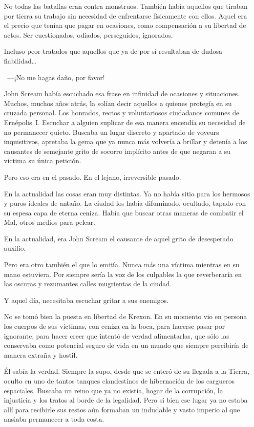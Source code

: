 No todas las batallas eran contra monstruos. También había aquellos que tiraban por tierra su trabajo sin necesidad de enfrentarse físicamente con ellos. Aquel era el precio que tenían que pagar en ocasiones, como compensación a su libertad de actos. Ser cuestionados, odiados, perseguidos, ignorados.

Incluso peor tratados que aquellos que ya de por sí resultaban de dudosa fiabilidad\dots

\fancyparbreak
~---¡No me hagas daño, por favor!

John Scream había escuchado esa frase en infinidad de ocasiones y situaciones. Muchos, muchos años atrás, la solían decir aquellos a quienes protegía en su cruzada personal. Los honrados, rectos y voluntariosos ciudadanos comunes de Ernépolis~I. Escuchar a alguien suplicar de esa manera encendía su necesidad de no permanecer quieto. Buscaba un lugar discreto y apartado de voyeurs inquisitivos, apretaba la gema que ya nunca más volvería a brillar y detenía a los causantes de semejante grito de socorro implícito antes de que negaran a su víctima su única petición.

Pero eso era en el pasado. En el lejano, irreversible pasado.

En la actualidad las cosas eran muy distintas. Ya no había sitio para los hermosos y puros ideales de antaño. La ciudad los había difuminado, ocultado, tapado con su espesa capa de eterna ceniza. Había que buscar otras maneras de combatir el Mal, otros medios para pelear.

En la actualidad, era John Scream el causante de aquel grito de desesperado auxilio.

Pero era otro también el que lo emitía. Nunca más una víctima mientras en su mano estuviera. Por siempre sería la voz de los culpables la que reverberaría en las oscuras y rezumantes calles mugrientas de la ciudad.

Y aquel día, necesitaba escuchar gritar a sus enemigos.

No se tomó bien la puesta en libertad de Krexon. En su momento vio en persona los cuerpos de sus víctimas, con ceniza en la boca, para hacerse pasar por ignorante, para hacer creer que intentó de verdad alimentarlas, que sólo las conservaba como potencial seguro de vida en un mundo que siempre percibiría de manera extraña y hostil.

Él sabía la verdad. Siempre la supo, desde que se enteró de su llegada a la Tierra, oculto en uno de tantos tanques clandestinos de hibernación de los cargueros espaciales. Buscaba un reino que ya no existía, hogar de la corrupción, la injusticia y los tratos al borde de la legalidad. Pero si bien ese lugar ya no estaba allí para recibirle sus restos aún formaban un indudable y vasto imperio al que ansiaba permanecer a toda costa.

